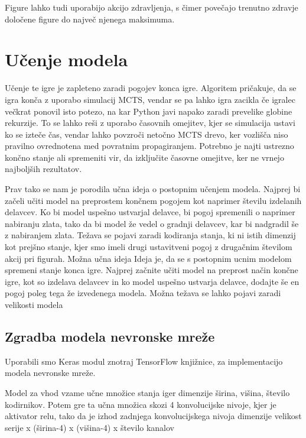 \documentclass[a4paper, 12pt]{book}
\begin{document}
Figure lahko tudi uporabijo akcijo zdravljenja, s čimer povečajo trenutno zdravje določene figure do največ njenega maksimuma.

\chapter{Učenje modela}
\label{chucenjemodela}

Učenje te igre je zapleteno zaradi pogojev konca igre. Algoritem pričakuje, da se igra konča z uporabo simulacij MCTS, vendar se pa lahko igra zacikla če igralec večkrat ponovil isto potezo, na kar Python javi napako zaradi prevelike globine rekurzije.
To se lahko reši z uporabo časovnih omejitev, kjer se simulacija ustavi ko se izteče čas, vendar lahko povzroči netočno MCTS drevo, ker vozlišča niso pravilno ovrednotena med povratnim propagiranjem.
Potrebno je najti ustrezno končno stanje ali spremeniti vir, da izključite časovne omejitve, ker ne vrnejo najboljših rezultatov.

Prav tako se nam je porodila učna ideja o postopnim učenjem modela. Najprej bi začeli učiti model na preprostem končnem pogojem kot naprimer številu izdelanih delavcev. Ko bi model uspešno ustvarjal delavce, bi pogoj spremenili o naprimer nabiranju zlata, tako da bi model že vedel o gradnji delavcev, kar bi nadgradil še z nabiranjem zlata. Težava se pojavi zaradi kodiranja stanja, ki ni istih dimenzij kot prejšno stanje, kjer smo imeli drugi ustavitveni pogoj z drugačnim številom akcij pri figurah.
Možna učna ideja
Ideja je, da se s postopnim ucnim modelom spremeni stanje konca igre. Najprej začnite učiti model na preprost način končne igre, kot so izdelava delavcev in ko model uspešno ustvarja delavce, dodajte še en pogoj poleg tega že izvedenega modela.
Možna težava se lahko pojavi zaradi velikosti modela

\section{Zgradba modela nevronske mreže}

Uporabili smo Keras modul znotraj TensorFlow knjižnice, za implementacijo modela nevronske mreže.

Model za vhod vzame učne množice stanja iger dimenzije širina, višina, število kodirnikov.
Potem gre ta učna množica skozi 4 konvolucijske nivoje, kjer je aktivator relu, tako da je izhod zadnjega konvolucijskega nivoja dimenzije velikost serije  x (širina-4) x (višina-4) x število kanalov
\end{document}

